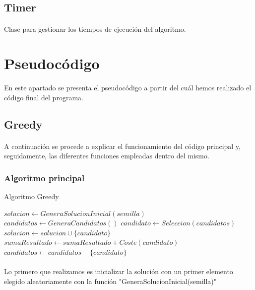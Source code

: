 \documentclass{article}
\begin{document}
	\subsection{Timer}
	
	\paragraph{}Clase para gestionar los tiempos de ejecución del algoritmo.
	
	\section{Pseudocódigo}
	
	\paragraph{}En este apartado se presenta el pseudocódigo a partir del cuál hemos realizado el código final del programa.
	
	\subsection{Greedy}
	
	\paragraph{}A continuación se procede a explicar el funcionamiento del código principal y, seguidamente, las diferentes funciones empleadas dentro del mismo.
	
	\subsubsection{Algoritmo principal}
	\begin{algorithm}[H]
		\caption{Algoritmo Greedy}
		\begin{algorithmic}
			\STATE $solucion \leftarrow GeneraSolucionInicial(semilla)$
			\STATE $candidatos \leftarrow GeneraCandidatos()$
			\STATE $candidato \leftarrow Seleccion(candidatos)$
			\STATE $solucion \leftarrow solucion \cup \{candidato\}$
			\STATE $sumaResultado \leftarrow sumaResultado + Coste(candidato)$
			\ENDIF
			\STATE $candidatos \leftarrow candidatos - \{ candidato \}$
			\ENDWHILE
		\end{algorithmic}
	\end{algorithm}
	
	\paragraph{}Lo primero que realizamos es inicializar la solución con un primer elemento elegido aleatoriamente con la función "GeneraSolucionInicial(semilla)"
	
\end{document}
